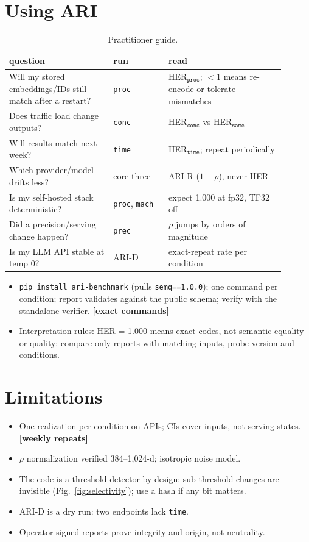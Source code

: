 \documentclass{article}
\newcommand{\todo}[1]{\textcolor{sTwo}{\textbf{[#1]}}}
\begin{document}
\section{Using ARI}\label{sec:use}
\begin{table}[h]\centering\footnotesize
\caption{Practitioner guide.}\label{tab:guide}
\begin{tabular}{p{0.34\linewidth}p{0.18\linewidth}p{0.38\linewidth}}
\toprule
question & run & read \\
\midrule
Will my stored embeddings/IDs still match after a restart? & \texttt{proc} & HER$_{\texttt{proc}}$; $<1$ means re-encode or tolerate mismatches \\
Does traffic load change outputs? & \texttt{conc} & HER$_{\texttt{conc}}$ vs HER$_{\texttt{same}}$ \\
Will results match next week? & \texttt{time} & HER$_{\texttt{time}}$; repeat periodically \\
Which provider/model drifts less? & core three & ARI-R ($1-\bar\rho$), never HER \\
Is my self-hosted stack deterministic? & \texttt{proc}, \texttt{mach} & expect 1.000 at fp32, TF32 off \\
Did a precision/serving change happen? & \texttt{prec} & $\rho$ jumps by orders of magnitude \\
Is my LLM API stable at temp 0? & ARI-D & exact-repeat rate per condition \\
\bottomrule
\end{tabular}
\end{table}
\begin{itemize}
  \item \texttt{pip install ari-benchmark} (pulls \texttt{semq==1.0.0}); one command per condition; report validates against the public schema; verify with the standalone verifier. \todo{exact commands}
  \item Interpretation rules: HER = 1.000 means exact codes, not semantic equality or quality; compare only reports with matching inputs, probe version and conditions.
\end{itemize}

\section{Limitations}
\begin{itemize}
  \item One realization per condition on APIs; CIs cover inputs, not serving states. \todo{weekly repeats}
  \item $\rho$ normalization verified 384--1{,}024-d; isotropic noise model.
  \item The code is a threshold detector by design: sub-threshold changes are invisible (Fig.~\ref{fig:selectivity}); use a hash if any bit matters.
  \item ARI-D is a dry run: two endpoints lack \texttt{time}.
  \item Operator-signed reports prove integrity and origin, not neutrality.
\end{itemize}
\end{document}
